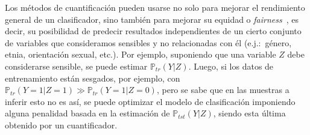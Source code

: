 Los métodos de cuantificación pueden usarse no solo para mejorar el rendimiento
general de un clasificador, sino también para mejorar su equidad o {\it
fairness\/}~\cite{biswas2021ensuring, fabris2023measuring}, es decir, su
posibilidad de predecir resultados independientes de un cierto conjunto de
variables que consideramos sensibles y no relacionadas con él (e.j.:~género,
etnia, orientación sexual, etc.). Por ejemplo, suponiendo que una variable $Z$
debe considerarse sensible, se puede estimar $\mathbb{P}_{tr}(Y|Z)$. Luego, si
los datos de entrenamiento están sesgados, por ejemplo, con
$\mathbb{P}_{tr}(Y=1|Z=1) \gg \mathbb{P}_{tr}(Y=1|Z=0)$, pero se sabe que en las
muestras a inferir esto no es así, se puede optimizar el modelo de clasificación
imponiendo alguna penalidad basada en la estimación de $\mathbb{P}_{tst}(Y|Z)$,
siendo esta última obtenido por un cuantificador.
